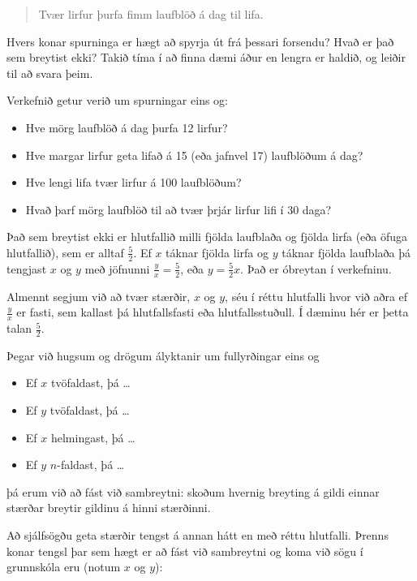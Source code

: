 \documentclass[
  icelandic,
]{book}
\providecommand{\tightlist}{%
  \setlength{\itemsep}{0pt}\setlength{\parskip}{0pt}}
\theoremstyle{definition}
\theoremstyle{definition}
\theoremstyle{definition}
\theoremstyle{definition}
\theoremstyle{remark}
\begin{document}
\begin{quote}
Tvær lirfur þurfa fimm laufblöð á dag til lifa.
\end{quote}

Hvers konar spurninga er hægt að spyrja út frá þessari forsendu? Hvað er það sem breytist ekki? Takið tíma í að finna dæmi áður en lengra er haldið, og leiðir til að svara þeim.

Verkefnið getur verið um spurningar eins og:

\begin{itemize}
\tightlist
\item
  Hve mörg laufblöð á dag þurfa 12 lirfur?
\item
  Hve margar lirfur geta lifað á 15 (eða jafnvel 17) laufblöðum á dag?
\item
  Hve lengi lifa tvær lirfur á 100 laufblöðum?
\item
  Hvað þarf mörg laufblöð til að tvær þrjár lirfur lifi í 30 daga?
\end{itemize}

Það sem breytist ekki er hlutfallið milli fjölda laufblaða og fjölda lirfa (eða öfuga hlutfallið), sem er alltaf \(\frac{5}{2}\). Ef \(x\) táknar fjölda lirfa og \(y\) táknar fjölda laufblaða þá tengjast \(x\) og \(y\) með jöfnunni \(\frac{y}{x}=\frac{5}{2}\), eða \(y=\frac{5}{2}x\). Það er óbreytan í verkefninu.

Almennt segjum við að tvær stærðir, \(x\) og \(y\), séu í réttu hlutfalli hvor við aðra ef \(\frac{y}{x}\) er fasti, sem kallast þá hlutfallsfasti eða hlutfallsstuðull. Í dæminu hér er þetta talan \(\frac{5}{2}\).

Þegar við hugsum og drögum ályktanir um fullyrðingar eins og

\begin{itemize}
\tightlist
\item
  Ef \(x\) tvöfaldast, þá \ldots{}
\item
  Ef \(y\) tvöfaldast, þá \ldots{}
\item
  Ef \(x\) helmingast, þá \ldots{}
\item
  Ef \(y\) \(n\)-faldast, þá \ldots{}
\end{itemize}

þá erum við að fást við sambreytni: skoðum hvernig breyting á gildi einnar stærðar breytir gildinu á hinni stærðinni.

Að sjálfsögðu geta stærðir tengst á annan hátt en með réttu hlutfalli. Þrenns konar tengsl þar sem hægt er að fást við sambreytni og koma við sögu í grunnskóla eru (notum \(x\) og \(y\)):
\end{document}

